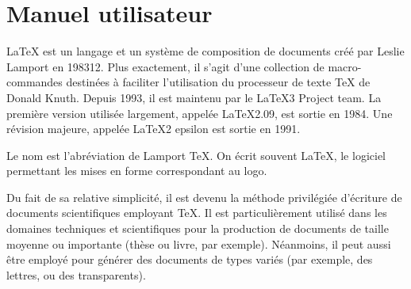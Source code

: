 \section{Manuel utilisateur}


LaTeX est un langage et un système de composition de documents créé par Leslie Lamport en 198312. Plus exactement, il s'agit d'une collection de macro-commandes destinées à faciliter l'utilisation du \og processeur de texte \fg{} TeX de Donald Knuth. Depuis 1993, il est maintenu par le LaTeX3 Project team. La première version utilisée largement, appelée LaTeX2.09, est sortie en 1984. Une révision majeure, appelée LaTeX2 epsilon est sortie en 1991.

Le nom est l'abréviation de Lamport TeX. On écrit souvent \LaTeX, le logiciel permettant les mises en forme correspondant au logo.

Du fait de sa relative simplicité, il est devenu la méthode privilégiée d'écriture de documents scientifiques employant TeX. Il est particulièrement utilisé dans les domaines techniques et scientifiques pour la production de documents de taille moyenne ou importante (thèse ou livre, par exemple). Néanmoins, il peut aussi être employé pour générer des documents de types variés (par exemple, des lettres, ou des transparents).

